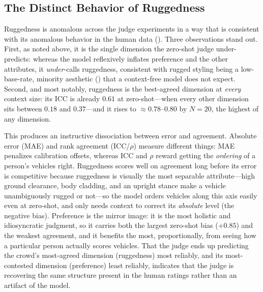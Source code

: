 \subsection{The Distinct Behavior of Ruggedness}
\label{sec:disc-rugged-judge}
Ruggedness is anomalous across the judge experiments in a way that is consistent
with its anomalous behavior in the human data ().
Three observations stand out. First, as noted above, it is the single dimension the
zero-shot judge under-predicts: whereas the model reflexively inflates preference
and the other attributes, it \emph{under}-calls ruggedness, consistent with rugged
styling being a low-base-rate, minority aesthetic () that a
context-free model does not expect. Second, and most notably, ruggedness is the
best-agreed dimension at \emph{every} context size: its ICC is already $0.61$ at
zero-shot---when every other dimension sits between $0.18$ and $0.37$---and it rises
to $\approx 0.78$--$0.80$ by $N{=}20$, the highest of any dimension.

This produces an instructive dissociation between error and agreement. Absolute
error (MAE) and rank agreement (ICC/$\rho$) measure different things: MAE penalizes
calibration offsets, whereas ICC and $\rho$ reward getting the \emph{ordering} of a
person's vehicles right. Ruggedness scores well on agreement long before its error
is competitive because ruggedness is visually the most separable attribute---high
ground clearance, body cladding, and an upright stance make a vehicle
unambiguously rugged or not---so the model orders vehicles along this axis
easily even at zero-shot, and only needs context to correct its \emph{absolute}
level (the negative bias). Preference is the mirror image: it is the most holistic
and idiosyncratic judgment, so it carries both the largest zero-shot bias
($+0.85$) and the weakest agreement, and it benefits the most, proportionally,
from seeing how a particular person actually scores vehicles. That the judge ends
up predicting the crowd's most-agreed dimension (ruggedness) most reliably, and its
most-contested dimension (preference) least reliably, indicates that the judge is
recovering the same structure present in the human ratings rather than an artifact
of the model.
